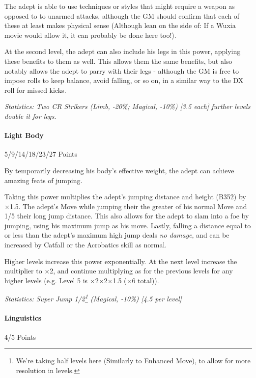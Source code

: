 \begin{multicols*}{3}
		The adept is able to use techniques or styles that might require a weapon as opposed to to unarmed attacks, although the GM should confirm that each of these at least makes physical sense (Although lean on the side of: If a Wuxia movie would allow it, it can probably be done here too!).
		
		At the second level, the adept can also include his legs in this power, applying these benefits to them as well. This allows them the same benefits, but also notably allows the adept to parry with their legs - although the GM is free to impose rolls to keep balance, avoid falling, or so on, in a similar way to the DX roll for missed kicks.

		\textcolor{OliveGreen}{\textit{Statistics: Two CR Strikers (Limb, -20\%; Magical, -10\%) [3.5 each] further levels double it for legs. }}
	
	\paragraph{Light Body}
	\begin{flushright}
		5/9/14/18/23/27 Points
	\end{flushright}

		By temporarily decreasing his body's effective weight, the adept can achieve amazing feats of jumping.
		
		Taking this power multiplies the adept's jumping distance and height (B352) by $\times$1.5. The adept's Move while jumping their the greater of his normal Move and 1/5 their long jump distance. This also allows for the adept to slam into a foe by jumping, using his maximum jump as his move. Lastly, falling a distance equal to or less than the adept's maximum high jump deals \textit{no damage}, and can be increased by Catfall or the Acrobatics skill as normal.
		
		Higher levels increase this power exponentially. At the next level increase the multiplier to $\times$2, and continue multiplying as for the previous levels for any higher levels (e.g. Level 5 is $\times$2$\times$2$\times$1.5 ($\times$6 total)).

		\textcolor{OliveGreen}{\textit{Statistics: Super Jump 1/2\footnote{We're taking half levels here (Similarly to Enhanced Move), to allow for more resolution in levels.} (Magical, -10\%) [4.5 per level]}}

	\paragraph{Linguistics}
	\begin{flushright}
		4/5 Points
	\end{flushright}


\end{multicols*}
